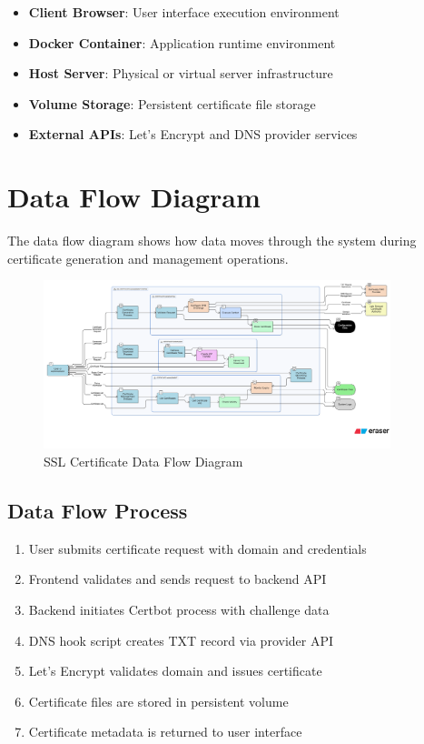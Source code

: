 \begin{itemize}
    \item \textbf{Client Browser}: User interface execution environment
    \item \textbf{Docker Container}: Application runtime environment
    \item \textbf{Host Server}: Physical or virtual server infrastructure
    \item \textbf{Volume Storage}: Persistent certificate file storage
    \item \textbf{External APIs}: Let's Encrypt and DNS provider services
\end{itemize}

\section{Data Flow Diagram}

The data flow diagram shows how data moves through the system during certificate generation and management operations.

\begin{figure}[h]
\centering
\includegraphics[width=0.9\textwidth]{diagram-images/3.8-data-flow-diagram.png}
\caption{SSL Certificate Data Flow Diagram}
\label{fig:data-flow-diagram}
\end{figure}

\subsection{Data Flow Process}

\begin{enumerate}
    \item User submits certificate request with domain and credentials
    \item Frontend validates and sends request to backend API
    \item Backend initiates Certbot process with challenge data
    \item DNS hook script creates TXT record via provider API
    \item Let's Encrypt validates domain and issues certificate
    \item Certificate files are stored in persistent volume
    \item Certificate metadata is returned to user interface
\end{enumerate}

